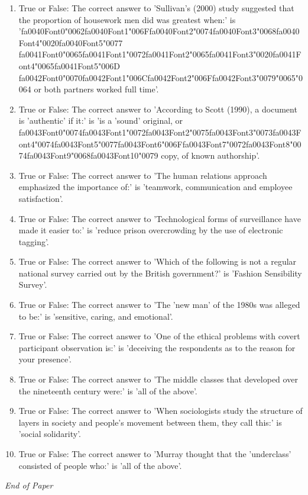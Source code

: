 \documentclass[12pt]{article}
\begin{document}
\begin{enumerate}[label=\arabic*.]
\item True or False: The correct answer to 'Sullivan's (2000) study suggested that the proportion of housework men did was greatest when:' is '{\csname fa0040Font0\endcsname\char"0062}{\csname fa0040Font1\endcsname\char"006F}{\csname fa0040Font2\endcsname\char"0074}{\csname fa0040Font3\endcsname\char"0068}{\csname fa0040Font4\endcsname\char"0020}{\csname fa0040Font5\endcsname\char"0077} {\csname fa0041Font0\endcsname\char"0065}{\csname fa0041Font1\endcsname\char"0072}{\csname fa0041Font2\endcsname\char"0065}{\csname fa0041Font3\endcsname\char"0020}{\csname fa0041Font4\endcsname\char"0065}{\csname fa0041Font5\endcsname\char"006D} {\csname fa0042Font0\endcsname\char"0070}{\csname fa0042Font1\endcsname\char"006C}{\csname fa0042Font2\endcsname\char"006F}{\csname fa0042Font3\endcsname\char"0079}{\char"0065}{\char"0064} or both partners worked full time'.
\item True or False: The correct answer to 'According to Scott (1990), a document is 'authentic' if it:' is 'is a 'sound' original, or {\csname fa0043Font0\endcsname\char"0074}{\csname fa0043Font1\endcsname\char"0072}{\csname fa0043Font2\endcsname\char"0075}{\csname fa0043Font3\endcsname\char"0073}{\csname fa0043Font4\endcsname\char"0074}{\csname fa0043Font5\endcsname\char"0077}{\csname fa0043Font6\endcsname\char"006F}{\csname fa0043Font7\endcsname\char"0072}{\csname fa0043Font8\endcsname\char"0074}{\csname fa0043Font9\endcsname\char"0068}{\csname fa0043Font10\endcsname\char"0079} copy, of known authorship'.
\item True or False: The correct answer to 'The human relations approach emphasized the importance of:' is 'teamwork, communication and employee satisfaction'.
\item True or False: The correct answer to 'Technological forms of surveillance have made it easier to:' is 'reduce prison overcrowding by the use of electronic tagging'.
\item True or False: The correct answer to 'Which of the following is not a regular national survey carried out by the British government?' is 'Fashion Sensibility Survey'.
\item True or False: The correct answer to 'The 'new man' of the 1980s was alleged to be:' is 'sensitive, caring, and emotional'.
\item True or False: The correct answer to 'One of the ethical problems with covert participant observation is:' is 'deceiving the respondents as to the reason for your presence'.
\item True or False: The correct answer to 'The middle classes that developed over the nineteenth century were:' is 'all of the above'.
\item True or False: The correct answer to 'When sociologists study the structure of layers in society and people's movement between them, they call this:' is 'social solidarity'.
\item True or False: The correct answer to 'Murray thought that the 'underclass' consisted of people who:' is 'all of the above'.
\end{enumerate}

\vfill
\noindent\textit{End of Paper}
\end{document}
